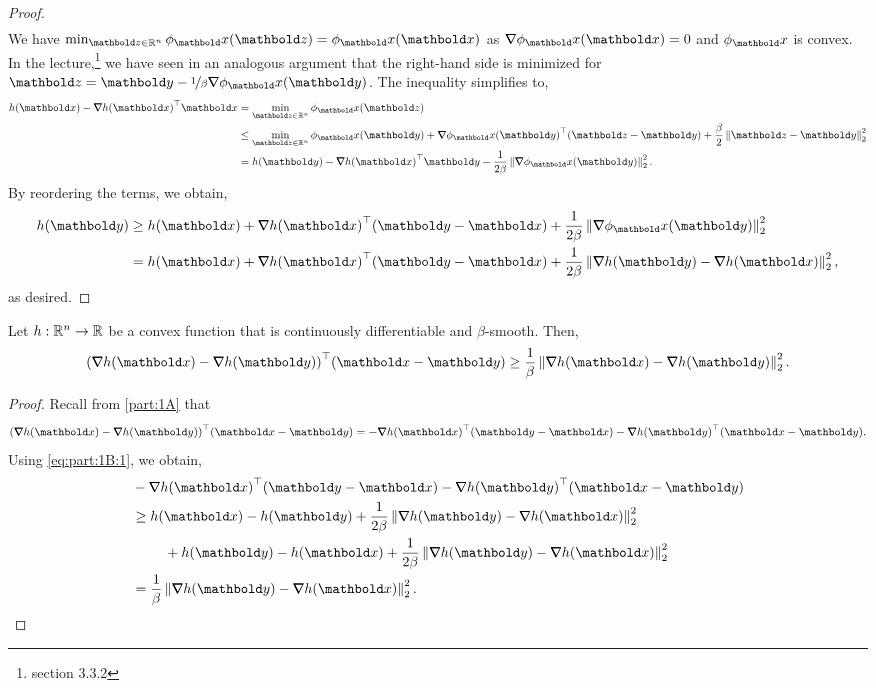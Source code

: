 \documentclass{tufte-handout}
\begin{document}
\begin{proof}
\begin{align*}
\end{align*} We have $\min_{\vz \in \R^n} \phi_\vx(\vz) = \phi_\vx(\vx)$ as $\grad \phi_\vx(\vx) = 0$ and $\phi_\vx$ is convex. In the lecture,\footnote{section 3.3.2} we have seen in an analogous argument that the right-hand side is minimized for $\vz = \vy - \nicefrac{1}{\beta} \grad \phi_\vx(\vy)$. The inequality simplifies to, \begin{align*}
    h(\vx) - \trans{\grad h(\vx)} \vx &= \min_{\vz \in \R^n} \phi_\vx(\vz) \\
    &\leq \min_{\vz \in \R^n} \phi_\vx(\vy) + \trans{\grad \phi_\vx(\vy)}(\vz - \vy) + \frac{\beta}{2} \norm{\vz - \vy}_2^2 \\
    &= h(\vy) - \trans{\grad h(\vx)}\vy - \frac{1}{2 \beta}\norm{\grad \phi_\vx(\vy)}_2^2.
\end{align*} By reordering the terms, we obtain, \begin{align*}
    h(\vy) &\geq h(\vx) + \trans{\grad h(\vx)}(\vy - \vx) + \frac{1}{2 \beta}\norm{\grad \phi_\vx(\vy)}_2^2 \\
    &= h(\vx) + \trans{\grad h(\vx)}(\vy - \vx) + \frac{1}{2 \beta}\norm{\grad h(\vy) - \grad h(\vx)}_2^2,
\end{align*} as desired.
\end{proof}

\begin{lem}
Let $h : \mathbb{R}^n \to \mathbb{R}$ be a convex function that is continuously differentiable and $\beta$-smooth. Then, \begin{align}
    \trans{(\grad h(\vx) - \grad h(\vy))}(\vx - \vy) \geq \frac{1}{\beta} \norm{\grad h(\vx) - \grad h(\vy)}_2^2. \label{eq:part:1B}
\end{align}
\end{lem}
\begin{proof} Recall from \cref{part:1A} that \begin{align*}
    \trans{(\grad h(\vx) - \grad h(\vy))}(\vx - \vy) = - \trans{\grad h(\vx)}(\vy - \vx) - \trans{\grad h(\vy)}(\vx - \vy).
\end{align*} Using \cref{eq:part:1B:1}, we obtain, \begin{align*}
    &- \trans{\grad h(\vx)}(\vy - \vx) - \trans{\grad h(\vy)}(\vx - \vy) \\
    &\geq \begin{multlined}[t]
        h(\vx) - h(\vy) + \frac{1}{2 \beta}\norm{\grad h(\vy) - \grad h(\vx)}_2^2 \\ + h(\vy) - h(\vx) + \frac{1}{2 \beta}\norm{\grad h(\vy) - \grad h(\vx)}_2^2
    \end{multlined} \\
    &= \frac{1}{\beta}\norm{\grad h(\vy) - \grad h(\vx)}_2^2. \qedhere
\end{align*}
\end{proof}
\end{document}
